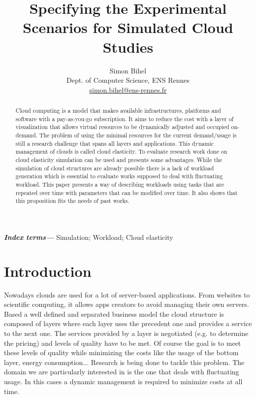 \documentclass[a4paper, onecolumn, 11pt]{article}
\title{Specifying the Experimental Scenarios for Simulated Cloud Studies}
\author{Simon Bihel \\ Dept. of Computer Science, ENS Rennes\\
  \href{mailto:simon.bihel@ens-rennes.fr}{simon.bihel@ens-rennes.fr}}
\begin{document}
\maketitle

\begin{abstract}
  Cloud computing is a model that makes available infrastructures, platforms and
  software with a pay-as-you-go subscription. It aims to reduce the cost with a
  layer of visualization that allows virtual resources to be dynamically
  adjusted and occupied on-demand. The problem of using the minimal resources
  for the current demand/usage is still a research challenge that spans all
  layers and applications. This dynamic management of clouds is called cloud
  elasticity. To evaluate research work done on cloud elasticity simulation can
  be used and presents some advantages. While the simulation of cloud structures
  are already possible there is a lack of workload generation which is essential
  to evaluate works supposed to deal with fluctuating workload. This paper
  presents a way of describing workloads using tasks that are repeated over time
  with parameters that can be modified over time. It also shows that this
  proposition fits the needs of past works.
\end{abstract}

\providecommand{\keywords}[1]{\textbf{\textit{Index terms---}} #1}
\keywords{Simulation; Workload; Cloud elasticity}

\section{Introduction} \label{intro}
  Nowadays clouds are used for a lot of server-based applications. From websites
  to scientific computing, it allows apps creators to avoid managing their own
  servers. Based a well defined and separated business model the cloud structure
  is composed of layers where each layer uses the precedent one and provides a
  service to the next one. The services provided by a layer is negotiated (e.g.
  to determine the pricing) and levels of quality have to be met. Of course the
  goal is to meet these levels of quality while minimizing the costs like the
  usage of the bottom layer, energy consumption... Research is being done to
  tackle this problem. The domain we are particularly interested in is the one
  that deals with fluctuating usage. In this cases a dynamic management is
  required to minimize costs at all time.
  
\end{document}
